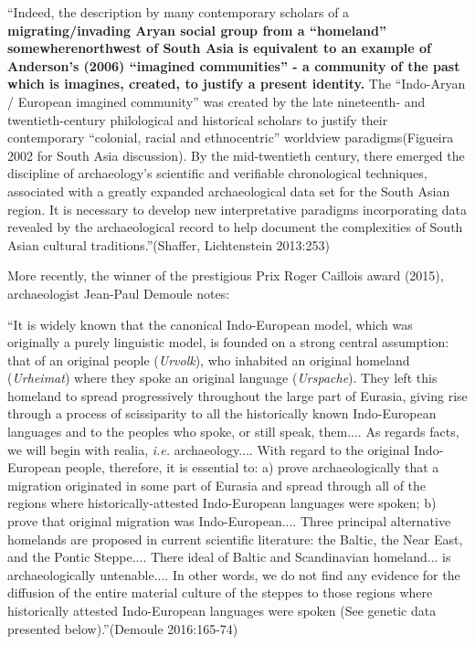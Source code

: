 \begin{myquote}
“Indeed, the description by many contemporary scholars of a \textbf{migrating/invading Aryan social group from a “homeland” somewhere\break northwest of South Asia is equivalent to an example of Anderson’s (2006) “imagined communities” - a community of the past which is imagines, created, to justify a present identity.} The “Indo-Aryan / European imagined community” was created by the late nineteenth- and twentieth-century philological and historical scholars to justify their contemporary “colonial, racial and ethnocentric” worldview paradigms\break (Figueira 2002 for South Asia discussion). By the mid-twentieth century, there emerged the discipline of archaeology’s scientific and verifiable chronological techniques, associated with a greatly expanded archaeological data set for the South Asian region. It is necessary to develop new interpretative paradigms incorporating data revealed by the archaeological record to help document the complexities of South Asian cultural traditions.”\hfill (Shaffer, Lichtenstein 2013:253)
\end{myquote}

More recently, the winner of the prestigious Prix Roger Caillois award (2015), archaeologist Jean-Paul Demoule notes:

\begin{myquote}
“It is widely known that the canonical Indo-European model, which was originally a purely linguistic model, is founded on a strong central assumption: that of an original people (\textit{Urvolk}), who inhabited an original homeland (\textit{Urheimat}) where they spoke an original language (\textit{Urspache}). They left this homeland to spread progressively throughout the large part of Eurasia, giving rise through a process of scissiparity to all the historically known Indo-European languages and to the peoples who spoke, or still speak, them.... As regards facts, we will begin with realia, \textit{i.e.} archaeology.... With regard to the original Indo-European people, therefore, it is essential to: a) prove archaeologically that a migration originated in some part of Eurasia and spread through all of the regions where historically-attested Indo-European languages were spoken; b) prove that original migration was Indo-European.... Three principal alternative homelands are proposed in current scientific literature: the Baltic, the Near East, and the Pontic Steppe.... There ideal of Baltic and Scandinavian homeland... is archaeologically untenable.... In other words, we do not find any evidence for the diffusion of the entire material culture of the steppes to those regions where historically attested Indo-European languages were spoken (See genetic data presented below).”\hfill (Demoule 2016:165-74)
\end{myquote}

